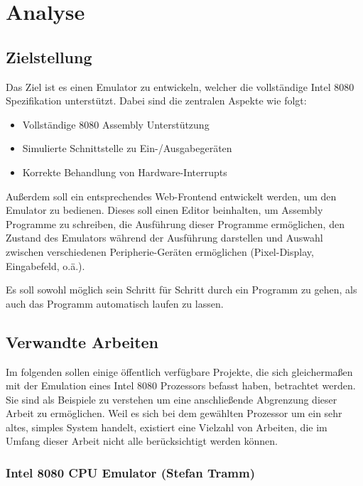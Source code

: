 \chapter{Analyse}

\section{Zielstellung}\label{goals}

Das Ziel ist es einen Emulator zu entwickeln, welcher die vollständige Intel 8080 Spezifikation\cite{datasheet} unterstützt. Dabei sind die zentralen Aspekte wie folgt:

\begin{itemize}
    \item Vollständige 8080 Assembly Unterstützung
    \item Simulierte Schnittstelle zu Ein-/Ausgabegeräten
    \item Korrekte Behandlung von Hardware-Interrupts
\end{itemize}

Außerdem soll ein entsprechendes Web-Frontend entwickelt werden, um den Emulator zu bedienen.
Dieses soll einen Editor beinhalten, um Assembly Programme zu schreiben, die Ausführung dieser Programme ermöglichen, den Zustand des Emulators während der Ausführung darstellen und Auswahl zwischen verschiedenen Peripherie-Geräten ermöglichen (Pixel-Display, Eingabefeld, o.ä.). 

Es soll sowohl möglich sein Schritt für Schritt durch ein Programm zu gehen, als auch das Programm automatisch laufen zu lassen.

\section{Verwandte Arbeiten}

Im folgenden sollen einige öffentlich verfügbare Projekte, die sich gleichermaßen mit der Emulation eines Intel 8080 Prozessors befasst haben, betrachtet werden. Sie sind als Beispiele zu verstehen um eine anschließende Abgrenzung dieser Arbeit zu ermöglichen. Weil es sich bei dem gewählten Prozessor um ein sehr altes, simples System handelt, existiert eine Vielzahl von Arbeiten, die im Umfang dieser Arbeit nicht alle berücksichtigt werden können.

\subsection{Intel 8080 CPU Emulator (Stefan Tramm)}

